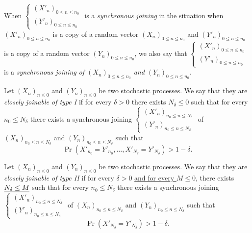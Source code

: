 \documentclass[12pt,a4paper]{article}
\begin{document}
When $\left\{\begin{smallmatrix} {(X'_n)}_{0 \leq n \leq n_0} \\ 
{(Y'_n)}_{0 \leq n \leq n_0}
\end{smallmatrix}\right.$  is a \emph{synchronous joining} in the situation when 
${(X'_n)}_{0 \leq n \leq n_0}$ is a copy of a random vector 
${(X_n)}_{0 \leq n \leq n_0}$  and ${(Y'_n)}_{0 \leq n \leq n_0}$ 
is a copy of a random vector ${(Y_n)}_{0 \leq n \leq n_0}$, we also say that 
$\left\{\begin{smallmatrix} {(X'_n)}_{0 \leq n \leq n_0} \\ 
{(Y'_n)}_{0 \leq n \leq n_0}
\end{smallmatrix}\right.$  is a \emph{synchronous joining of 
${(X_n)}_{0 \leq n \leq n_0}$ and ${(Y_n)}_{0 \leq n \leq n_0}$}. 

\begin{definition}
Let ${(X_n)}_{n \leq 0}$ and ${(Y_n)}_{n \leq 0}$ be two stochastic processes. 
We say that they are \emph{closely joinable of type I} if for every $\delta >0$ there exists 
$N_\delta \leq 0$ such that for every $n_0 \leq N_\delta$ there exists a 
synchronous joining $\left\{\begin{smallmatrix} {(X'_n)}_{n_0 \leq n \leq N_\delta} \\ 
{(Y'_n)}_{n_0 \leq n \leq N_\delta}
\end{smallmatrix}\right.$ 
of ${(X_n)}_{n_0 \leq n \leq N_\delta}$ and ${(Y_n)}_{n_0 \leq n \leq N_\delta}$ 
such that 
$$
\Pr(X'_{n_0}=Y'_{n_0}, \ldots, X'_{N_\delta}=Y'_{N_\delta}) > 1-\delta. 
$$ 
\end{definition}

\begin{definition}
Let ${(X_n)}_{n \leq 0}$ and ${(Y_n)}_{n \leq 0}$ be two stochastic processes. 
We say that they are \emph{closely joinable of type II} if for every $\delta >0$ 
\uline{and for every $M\leq 0$}, there exists 
$\uline{N_\delta \leq M}$ such that for every $n_0 \leq N_\delta$ there exists a 
synchronous joining $\left\{\begin{smallmatrix} {(X'_n)}_{n_0 \leq n \leq N_\delta} \\ 
{(Y'_n)}_{n_0 \leq n \leq N_\delta}
\end{smallmatrix}\right.$ 
of ${(X_n)}_{n_0 \leq n \leq N_\delta}$ and ${(Y_n)}_{n_0 \leq n \leq N_\delta}$ 
such that 
$$
\Pr(X'_{N_\delta}=Y'_{N_\delta}) > 1-\delta. 
$$ 
\end{definition}
\end{document}
